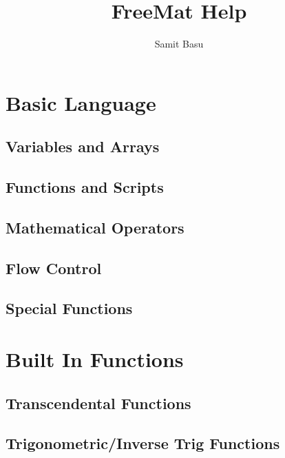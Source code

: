 \documentclass{book}
\title{FreeMat Help}
\author{Samit Basu}
\begin{document}
\maketitle
\tableofcontents
\chapter{Basic Language}
\section{Variables and Arrays}






\section{Functions and Scripts}








\section{Mathematical Operators}















\section{Flow Control}












\section{Special Functions}








\chapter{Built In Functions}
\section{Transcendental Functions}


\section{Trigonometric/Inverse Trig Functions}










\end{document}
